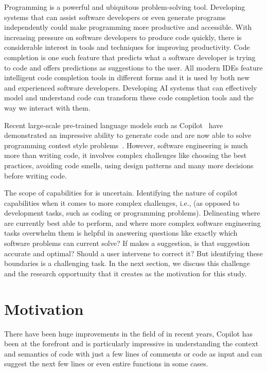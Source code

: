 \label{chapter:introduction}
Programming is a powerful and ubiquitous problem-solving tool. Developing systems that can assist software developers or even generate programs independently could make programming more productive and accessible. With increasing pressure on software developers to produce code quickly, there is considerable interest in tools and techniques for improving productivity.
Code completion is one such feature that predicts what a software developer is trying to code and offers predictions as suggestions to the user. All modern IDEs feature intelligent code completion tools in different forms and it is used by both new and experienced software developers. Developing AI systems that can effectively model and understand code can transform these code completion tools and the way we interact with them.

Recent large-scale pre-trained language models such as Copilot~\cite{Copilot-web} have demonstrated an impressive ability to generate code and are now able to solve programming contest style problems~\cite{empirical_eval}. 
However, software engineering is much more than writing code, it involves complex challenges like choosing the best practices, avoiding code smells, using design patterns and many more decisions before writing code. 

The scope of capabilities for \cct{} is uncertain. Identifying the nature of copilot capabilities when it comes to more complex challenges, i.e., \AISE{} (as opposed to development tasks, such as coding or programming problems). Delineating where \cct{} are currently best able to perform, and where more complex software engineering tasks overwhelm them is helpful in answering questions like 
exactly which software problems can current \cct{} solve? 
If \cct{} makes a suggestion, is that suggestion accurate and optimal? Should a user intervene to correct it? But identifying these boundaries is a challenging task. In the next section, we discuss this challenge and the research opportunity that it creates as the motivation for this study.

\section{Motivation}
There have been huge improvements in the field of \cct{} in recent years, Copilot has been at the forefront and is particularly impressive in understanding the context and semantics of code with just a few lines of comments or code as input and can suggest the next few lines or even entire functions in some cases. 

